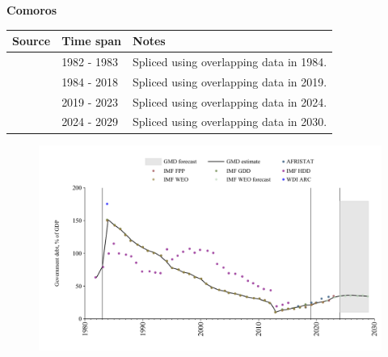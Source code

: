 \documentclass[12pt,a4paper,landscape]{article}
\begin{document}
\begin{adjustbox}{max totalsize={\paperwidth}{\paperheight},center}
\begin{minipage}[t][\textheight][t]{\textwidth}
\vspace*{0.5cm}
{}
\begin{center}
{\Large\bfseries Comoros}
\end{center}
\vspace{0.5cm}
\begin{table}[H]
\centering
\small
\begin{tabular}{|l|l|l|}
\hline
\textbf{Source} & \textbf{Time span} & \textbf{Notes} \\
\hline
\rowcolor{white}\cite{IMF_HDD}& 1982 - 1983 &Spliced using overlapping data in 1984.\\
\rowcolor{lightgray}\cite{IMF_GDD}& 1984 - 2018 &Spliced using overlapping data in 2019.\\
\rowcolor{white}\cite{IMF_FPP}& 2019 - 2023 &Spliced using overlapping data in 2024.\\
\rowcolor{lightgray}\cite{IMF_WEO_forecast}& 2024 - 2029 &Spliced using overlapping data in 2030.\\
\hline
\end{tabular}
\end{table}
\begin{figure}[H]
\centering
\includegraphics[width=\textwidth,height=0.6\textheight,keepaspectratio]{graphs/COM_govdebt_GDP.pdf}
\end{figure}
\end{minipage}
\end{adjustbox}
\end{document}
